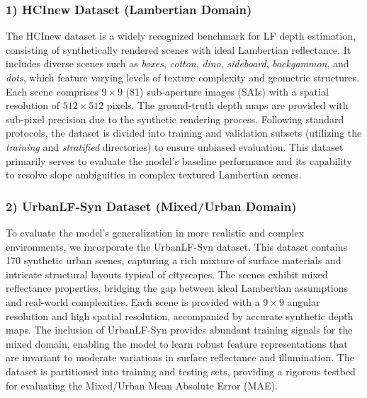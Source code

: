 \documentclass[lettersize,journal]{IEEEtran}
\begin{document}
\subsubsection{1) HCInew Dataset (Lambertian Domain)}
The HCInew dataset is a widely recognized benchmark for LF depth estimation, consisting of synthetically rendered scenes with ideal Lambertian reflectance. It includes diverse scenes such as \textit{boxes}, \textit{cotton}, \textit{dino}, \textit{sideboard}, \textit{backgammon}, and \textit{dots}, which feature varying levels of texture complexity and geometric structures. Each scene comprises $9 \times 9$ (81) sub-aperture images (SAIs) with a spatial resolution of $512 \times 512$ pixels. The ground-truth depth maps are provided with sub-pixel precision due to the synthetic rendering process. Following standard protocols, the dataset is divided into training and validation subsets (utilizing the \textit{training} and \textit{stratified} directories) to ensure unbiased evaluation. This dataset primarily serves to evaluate the model's baseline performance and its capability to resolve slope ambiguities in complex textured Lambertian scenes.

\subsubsection{2) UrbanLF-Syn Dataset (Mixed/Urban Domain)}
To evaluate the model's generalization in more realistic and complex environments, we incorporate the UrbanLF-Syn dataset. This dataset contains 170 synthetic urban scenes, capturing a rich mixture of surface materials and intricate structural layouts typical of cityscapes. The scenes exhibit mixed reflectance properties, bridging the gap between ideal Lambertian assumptions and real-world complexities. Each scene is provided with a $9 \times 9$ angular resolution and high spatial resolution, accompanied by accurate synthetic depth maps. The inclusion of UrbanLF-Syn provides abundant training signals for the mixed domain, enabling the model to learn robust feature representations that are invariant to moderate variations in surface reflectance and illumination. The dataset is partitioned into training and testing sets, providing a rigorous testbed for evaluating the Mixed/Urban Mean Absolute Error (MAE).
\end{document}
